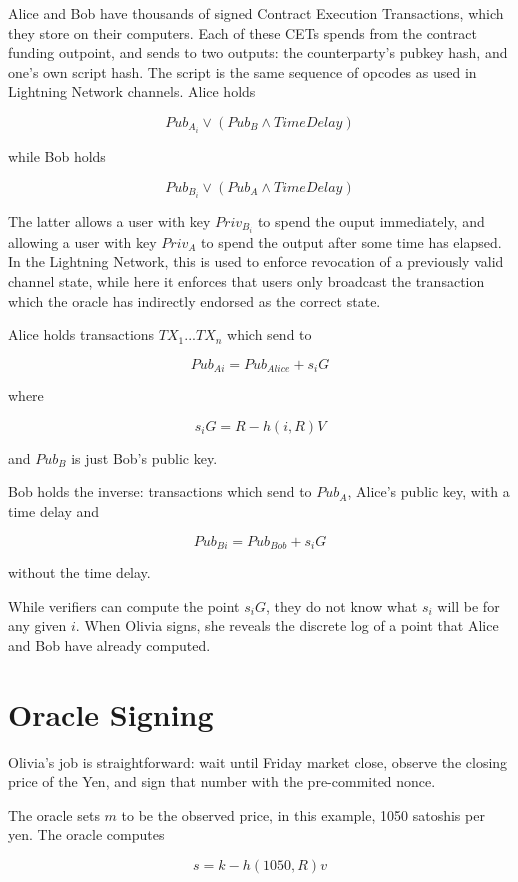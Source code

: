 \documentclass[11pt]{article}
\begin{document}
Alice and Bob have thousands of signed Contract Execution Transactions,  which they store on their computers.  Each of these CETs spends from the contract funding outpoint, and sends to two outputs: the counterparty's pubkey hash, and one's own script hash.  The script is the same sequence of opcodes as used in Lightning Network channels.  Alice holds

\[Pub_{A_i} \lor (Pub_{B} \land TimeDelay)\]

while Bob holds

\[Pub_{B_i} \lor (Pub_{A} \land TimeDelay)\]


The latter allows a user with key \(Priv_{B_i}\) to spend the ouput immediately, and allowing a user with key \(Priv_{A}\) to spend the output after some time has elapsed.  In the Lightning Network, this is used to enforce revocation of a previously valid  channel state,  while  here it enforces  that users only broadcast the transaction which the oracle has indirectly endorsed as the correct state.

Alice holds transactions \(TX_{1} ... TX_{n}\) which send to

\[Pub_{Ai} = Pub_{Alice} + s_iG\]

where 

\[s_iG = R - h(i, R)V\]

and \(Pub_B\) is just Bob's public key.

Bob holds the inverse: transactions which send to \(Pub_A\), Alice's public key, with a time delay and 

\[Pub_{Bi} = Pub_{Bob} + s_iG\]

without the time delay.

While verifiers can compute the point \(s_iG\), they do not know what \(s_i\) will be for any given \(i\).  When Olivia signs, she reveals the discrete log of a point that Alice and Bob have already computed.

\section*{Oracle Signing}

Olivia's job is straightforward: wait until Friday market close, observe the closing price of the Yen, and sign that number with the pre-commited nonce.

The oracle sets \(m\) to be the observed price, in this example, 1050 satoshis per yen.  The oracle computes

\[s = k - h(1050, R)v\]
\end{document}
